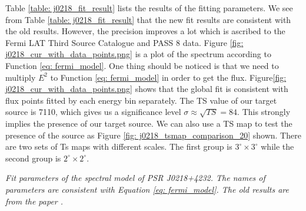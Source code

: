\documentclass[12pt]{report}
\newcommand{\mycaption}[1]{\caption{\textit{\footnotesize #1}}}
\begin{document}
            Table \ref{table: j0218_fit_result} lists the results of the fitting parameters. 
            We see from Table \ref{table: j0218_fit_result} that the new fit results are consistent 
            with the old results. However, the precision improves a lot which is ascribed to the 
            Fermi LAT Third Source Catalogue and PASS 8 data. Figure
            \ref{fig: j0218_cur_with_data_points.png} is a plot of the spectrum according to 
            Function \ref{eq: fermi_model}.
            One thing should be noticed is that we need to multiply $E^2$ to Function \ref{eq: fermi_model} 
            in order to get the flux. Figure\ref{fig: j0218_cur_with_data_points.png} shows that the global 
            fit is consistent with flux points fitted by each energy bin separately. 
            The TS value of our target source is 7110, which gives us 
            a significance level $\sigma \approx \sqrt{TS} = 84$. This strongly implies the presence of our
            target source. We can also use a TS map to test the presence of the source as Figure
            \ref{fig: j0218_tsmap_comparison_20} shown. 
            There are two sets of Ts maps with different scales. The first group is $3^{\circ} 
            \times3^{\circ}$ while the second group is $2^{\circ} \times2^{\circ}$. 
            \vspace{1cm}
            \begin{table}[!ht]
              \centering
                \mycaption{Fit parameters of the spectral model of PSR J0218+4232. 
                  The names of parameters are consistent with Equation
                  \ref{eq: fermi_model}. The old results are from the paper \cite{0067-0049-208-2-17}.}
                \label{table: j0218_fit_result}        
            \end{table}  
\end{document}
